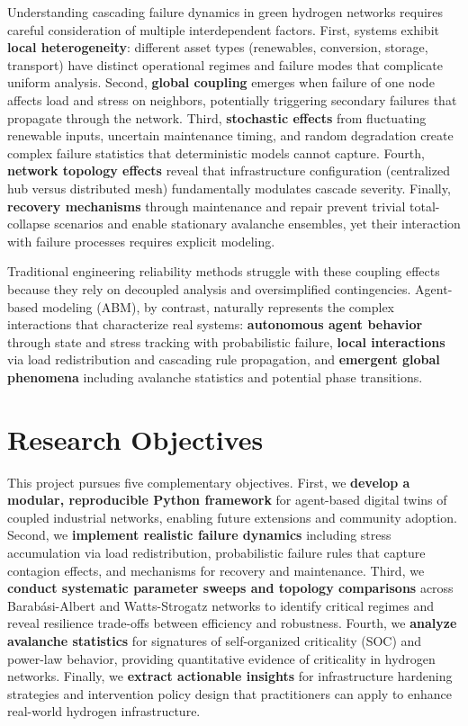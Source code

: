 \documentclass[12pt,a4paper,twoside]{report}
\begin{document}
Understanding cascading failure dynamics in green hydrogen networks requires careful consideration of multiple interdependent factors. First, systems exhibit \textbf{local heterogeneity}: different asset types (renewables, conversion, storage, transport) have distinct operational regimes and failure modes that complicate uniform analysis. Second, \textbf{global coupling} emerges when failure of one node affects load and stress on neighbors, potentially triggering secondary failures that propagate through the network. Third, \textbf{stochastic effects} from fluctuating renewable inputs, uncertain maintenance timing, and random degradation create complex failure statistics that deterministic models cannot capture. Fourth, \textbf{network topology effects} reveal that infrastructure configuration (centralized hub versus distributed mesh) fundamentally modulates cascade severity. Finally, \textbf{recovery mechanisms} through maintenance and repair prevent trivial total-collapse scenarios and enable stationary avalanche ensembles, yet their interaction with failure processes requires explicit modeling.

Traditional engineering reliability methods struggle with these coupling effects because they rely on decoupled analysis and oversimplified contingencies. Agent-based modeling (ABM), by contrast, naturally represents the complex interactions that characterize real systems: \textbf{autonomous agent behavior} through state and stress tracking with probabilistic failure, \textbf{local interactions} via load redistribution and cascading rule propagation, and \textbf{emergent global phenomena} including avalanche statistics and potential phase transitions.

\section{Research Objectives}

This project pursues five complementary objectives. First, we \textbf{develop a modular, reproducible Python framework} for agent-based digital twins of coupled industrial networks, enabling future extensions and community adoption. Second, we \textbf{implement realistic failure dynamics} including stress accumulation via load redistribution, probabilistic failure rules that capture contagion effects, and mechanisms for recovery and maintenance. Third, we \textbf{conduct systematic parameter sweeps and topology comparisons} across Barabási-Albert and Watts-Strogatz networks to identify critical regimes and reveal resilience trade-offs between efficiency and robustness. Fourth, we \textbf{analyze avalanche statistics} for signatures of self-organized criticality (SOC) and power-law behavior, providing quantitative evidence of criticality in hydrogen networks. Finally, we \textbf{extract actionable insights} for infrastructure hardening strategies and intervention policy design that practitioners can apply to enhance real-world hydrogen infrastructure.
\end{document}
